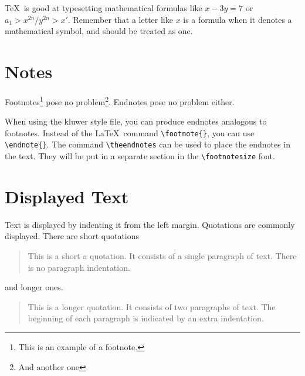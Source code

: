 \documentclass{kluwer}    %
\begin{document}
\begin{article}
\TeX\ is good at typesetting mathematical formulas like
       \( x-3y = 7 \) 
or
       \( a_{1} > x^{2n} / y^{2n} > x' \).
Remember that a letter like
       $x$        %
is a formula when it denotes a mathematical symbol, and should
be treated as one.


\section{Notes}
Footnotes\footnote{This is an example of a footnote.}
pose no problem\footnote{And another one}.
Endnotes pose no 
problem either.

When using the {\sc kluwer} style file, you can produce endnotes 
analogous to footnotes. Instead of the \LaTeX\ command \verb+\footnote{}+,
you can use \verb+\endnote{}+. The command \verb+\theendnotes+ can be used
to place the endnotes in the text. They will be put in a separate section in
the \verb+\footnotesize+ font.



\section{Displayed Text}

Text is displayed by indenting it from the left margin.
Quotations are commonly displayed.  There are short quotations
\begin{quote}
   This is a short a quotation.  It consists of a 
   single paragraph of text.  There is no paragraph
   indentation.
\end{quote}
and longer ones.
\begin{quotation}
   This is a longer quotation.  It consists of two paragraphs
   of text.  The beginning of each paragraph is indicated
   by an extra indentation.


\end{quotation}
\end{article}
\end{document}
